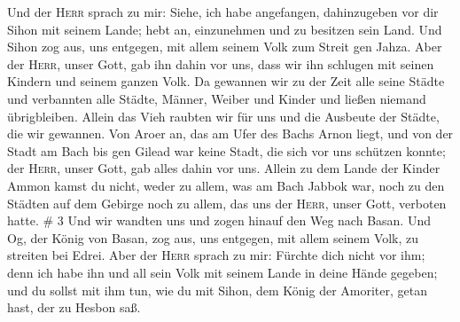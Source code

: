  Und der \textsc{Herr} sprach zu mir: Siehe, ich habe
angefangen, dahinzugeben vor dir Sihon mit seinem Lande; hebt an,
einzunehmen und zu besitzen sein Land.  Und Sihon zog
aus, uns entgegen, mit allem seinem Volk zum Streit gen Jahza.
 Aber der \textsc{Herr}, unser Gott, gab ihn dahin vor
uns, dass wir ihn schlugen mit seinen Kindern und seinem ganzen Volk.
 Da gewannen wir zu der Zeit alle seine Städte und
verbannten alle Städte, Männer, Weiber und Kinder und ließen niemand
übrigbleiben.  Allein das Vieh raubten wir für uns und
die Ausbeute der Städte, die wir gewannen.  Von Aroer an,
das am Ufer des Bachs Arnon liegt, und von der Stadt am Bach bis gen
Gilead war keine Stadt, die sich vor uns schützen konnte; der
\textsc{Herr}, unser Gott, gab alles dahin vor uns. 
Allein zu dem Lande der Kinder Ammon kamst du nicht, weder zu allem, was
am Bach Jabbok war, noch zu den Städten auf dem Gebirge noch zu allem,
das uns der \textsc{Herr}, unser Gott, verboten hatte. \# 3
 Und wir wandten uns und zogen hinauf den Weg nach Basan.
Und Og, der König von Basan, zog aus, uns entgegen, mit allem seinem
Volk, zu streiten bei Edrei.  Aber der \textsc{Herr}
sprach zu mir: Fürchte dich nicht vor ihm; denn ich habe ihn und all
sein Volk mit seinem Lande in deine Hände gegeben; und du sollst mit ihm
tun, wie du mit Sihon, dem König der Amoriter, getan hast, der zu Hesbon
saß.

